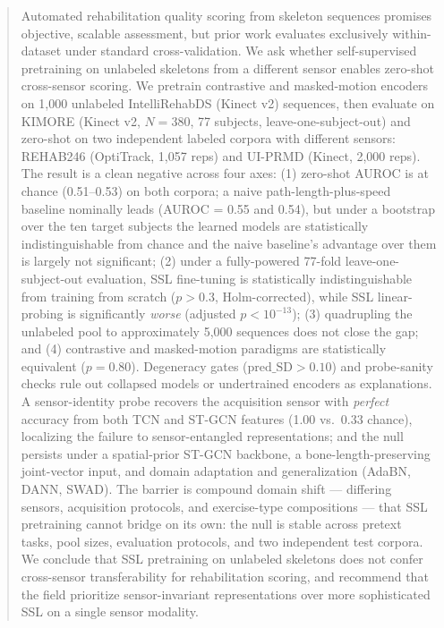 \documentclass[10pt,journal]{IEEEtran}
\begin{document}
\begin{abstract}
Automated rehabilitation quality scoring from skeleton sequences promises objective, scalable assessment, but prior work evaluates exclusively within-dataset under standard cross-validation. We ask whether self-supervised pretraining on unlabeled skeletons from a different sensor enables zero-shot cross-sensor scoring. We pretrain contrastive and masked-motion encoders on 1,000 unlabeled IntelliRehabDS (Kinect v2) sequences, then evaluate on KIMORE (Kinect v2, $N=380$, 77 subjects, leave-one-subject-out) and zero-shot on two independent labeled corpora with different sensors: REHAB246 (OptiTrack, 1,057 reps) and UI-PRMD (Kinect, 2,000 reps). The result is a clean negative across four axes:
(1) zero-shot AUROC is at chance (0.51--0.53) on both corpora; a naive path-length-plus-speed baseline nominally leads (AUROC = 0.55 and 0.54), but under a bootstrap over the ten target subjects the learned models are statistically indistinguishable from chance and the naive baseline's advantage over them is largely not significant;
(2) under a fully-powered 77-fold leave-one-subject-out evaluation, SSL fine-tuning is statistically indistinguishable from training from scratch ($p > 0.3$, Holm-corrected), while SSL linear-probing is significantly \emph{worse} (adjusted $p < 10^{-13}$);
(3) quadrupling the unlabeled pool to approximately 5,000 sequences does not close the gap; and
(4) contrastive and masked-motion paradigms are statistically equivalent ($p = 0.80$).
Degeneracy gates ($\text{pred\_SD} > 0.10$) and probe-sanity checks rule out collapsed models or undertrained encoders as explanations. A sensor-identity probe recovers the acquisition sensor with \emph{perfect} accuracy from both TCN and ST-GCN features (1.00 vs.\ 0.33 chance), localizing the failure to sensor-entangled representations; and the null persists under a spatial-prior ST-GCN backbone, a bone-length-preserving joint-vector input, and domain adaptation and generalization (AdaBN, DANN, SWAD).
The barrier is compound domain shift --- differing sensors, acquisition protocols, and exercise-type compositions --- that SSL pretraining cannot bridge on its own: the null is stable across pretext tasks, pool sizes, evaluation protocols, and two independent test corpora.
We conclude that SSL pretraining on unlabeled skeletons does not confer cross-sensor transferability for rehabilitation scoring, and recommend that the field prioritize sensor-invariant representations over more sophisticated SSL on a single sensor modality.
\end{abstract}
\end{document}
